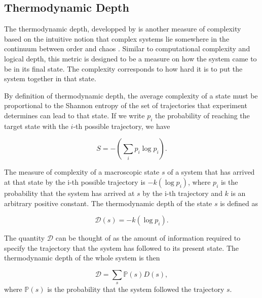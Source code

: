 \subsection{Thermodynamic Depth}

The thermodynamic depth, developped by
\textcite{lloydComplexityThermodynamicDepth1988} is another measure of
complexity based on the intuitive notion that complex systems lie somewhere in
the continuum between order and chaos
\parencite{chaitinInformationRandomnessIncompleteness1990,
  ceccattoComplexityHierarchicalSystems1988, deutschQuantumTheoryChurch1985}.
Similar to computational complexity and logical depth, this metric is designed
to be a measure on how the system came to be in its final state. The complexity
corresponds to how hard it is to put the system together in that state.

By definition of thermodynamic depth, the average complexity of a state must be
proportional to the Shannon entropy
\parencite{shannonMathematicalTheoryCommunication1975} of the set of
trajectories that experiment determines can lead to that state. If we write $p_i$ 
the probability of reaching the target state with the $i$-th possible trajectory, we have 

\begin{equation}
  \label{eq:3}
  S = -\left(\sum_{i} p_{i} \log p_{i}\right).
\end{equation}

The measure of complexity of a macroscopic state $s$ of a system that has
arrived at that state by the i-th possible trajectory is $-k(\log p_{i})$, where
$p_{i}$ is the probability that the system has arrived at $s$ by the i-th
trajectory and $k$ is an arbitrary positive constant. The thermodynamic depth of
the state $s$ is defined as

\begin{equation}
  \label{eq:4}
  \mathcal{D}(s) = -k(\log p_{i}).
\end{equation}

The quantity $\mathcal{D}$ can be thought of as the amount of information
required to specify the trajectory that the system has followed to its present
state. The thermodynamic depth of the whole system is then

\begin{equation}
  \label{eq:5}
  \mathcal{D} = \sum_{s}\mathbb{P}(s)D(s),
\end{equation}
where $\mathbb{P}(s)$ is the probability that the system followed the
trajectory $s$.

